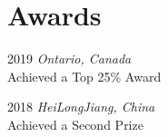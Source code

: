 \documentclass[11pt,a4paper,sans]{moderncv}        %
\begin{document}
\section{Awards}
 {2019 \vspace{-1.0em}}{}{
\emph{Ontario, Canada}\\
Achieved a Top 25\% Award}
\vspace{5 pt}


 {2018 \vspace{-1.0em}}{}{
\emph{HeiLongJiang, China}\\
Achieved a Second Prize
}

%
%
%  
  
\end{document}
